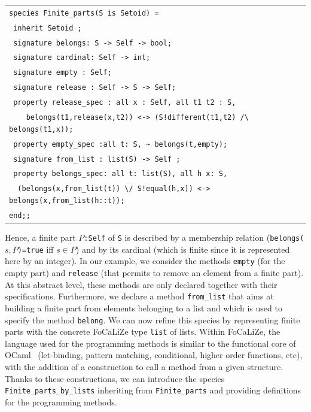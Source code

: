 \documentclass[submission,copyright,creativecommons]{eptcs}
\def\focalize{FoCaLiZe \mbox{}}
\begin{document}
\begin{center}
\begin{scriptsize}
\begin{tabular}{|l|}
\hline
\verb+species Finite_parts(S is Setoid) =+\\
\verb+ inherit Setoid ;+\\
\verb+ signature belongs: S -> Self -> bool;+\\
\verb+ signature cardinal: Self -> int;+\\
\verb+ signature empty : Self;+\\
\verb+ signature release : Self -> S -> Self;+\\
\verb+ property release_spec : all x : Self, all t1 t2 : S,+\\
\verb+    belongs(t1,release(x,t2)) <-> (S!different(t1,t2) /\ belongs(t1,x));+\\
\verb+ property empty_spec :all t: S, ~ belongs(t,empty);+\\
\verb+ signature from_list : list(S) -> Self ;+\\
\verb+ property belongs_spec: all t: list(S), all h x: S,+\\
\verb+  (belongs(x,from_list(t)) \/ S!equal(h,x)) <-> belongs(x,from_list(h::t));+\\
\verb+end;;+\\
\hline
\end{tabular}
\end{scriptsize}
\end{center}

\noindent
Hence, a finite part {\footnotesize \tt $P$:Self} of  
{\footnotesize \tt S} is described by a membership relation
({\footnotesize \tt belongs($s,P$)=true} iff $s \in P$) and by its
cardinal (which is finite since it is represented here by an integer).
In our example, we consider the methods 
{\footnotesize \tt empty} (for the empty part) and
{\footnotesize \tt release}
(that permits to remove an element from a finite part). At this abstract
level, these methods are only declared together with their
specifications.
Furthermore, we declare a method {\footnotesize \tt from\_list}  that aims at building a finite part
from elements belonging to a list and which is used to specify the
method {\footnotesize \tt belong}.
We can now refine this species by representing finite parts with
the concrete \focalize type {\footnotesize \tt list} 
of lists.  
Within FoCaLiZe, the
language used for the programming methods is similar to the functional core of 
OCaml~\cite{ocamldocu} (let-binding, pattern matching, conditional,
higher order functions, etc),
with the addition of a construction to call a method from a given
structure. 
Thanks to these constructions,  
we can introduce the species {\footnotesize \verb+Finite_parts_by_lists+}
inheriting from  {\footnotesize \verb+Finite_parts+}
and providing definitions for the
programming methods.
\end{document}
